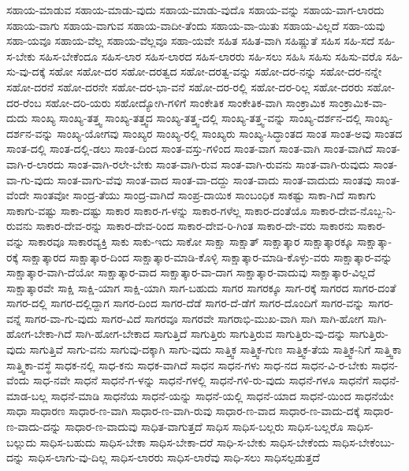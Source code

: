 {ಸಹಾಯ-ಮಾಡುವ
ಸಹಾಯ-ಮಾಡು-ವುದು
ಸಹಾಯ-ಮಾಡು-ವುದೊ
ಸಹಾಯ-ವನ್ನು
ಸಹಾಯ-ವಾಗ-ಲಾರದು
ಸಹಾಯ-ವಾಗು
ಸಹಾಯ-ವಾಗುವ
ಸಹಾಯ-ವಾದೀ-ತೆಂದು
ಸಹಾಯ-ವಾ-ಯಿತು
ಸಹಾಯ-ವಿಲ್ಲದೆ
ಸಹಾ-ಯವು
ಸಹಾ-ಯವೂ
ಸಹಾಯ-ವೆಲ್ಲ
ಸಹಾಯ-ವೆಲ್ಲವೂ
ಸಹಾ-ಯವೇ
ಸಹಿತ
ಸಹಿತ-ವಾಗಿ
ಸಹಿಷ್ಣುತೆ
ಸಹಿಸ
ಸಹಿ-ಸದೆ
ಸಹಿ-ಸ-ಬೇಕು
ಸಹಿಸ-ಬೇಕೆಂದೂ
ಸಹಿಸ-ಲಾರ
ಸಹಿಸ-ಲಾರದ
ಸಹಿಸ-ಲಾರರು
ಸಹಿ-ಸಲು
ಸಹಿಸಿ
ಸಹಿಸು
ಸಹಿಸು-ವರೊ
ಸಹಿ-ಸು-ವು-ದಕ್ಕೆ
ಸಹೋ
ಸಹೋ-ದರ
ಸಹೋ-ದರತ್ವದ
ಸಹೋ-ದರತ್ವ-ವನ್ನು
ಸಹೋ-ದರ-ನನ್ನು
ಸಹೋ-ದರ-ನನ್ನೇ
ಸಹೋ-ದರನೆ
ಸಹೋ-ದರನೇ
ಸಹೋ-ದರ-ಭಾ-ವನೆ
ಸಹೋ-ದರ-ರಲ್ಲಿ
ಸಹೋ-ದರ-ರಿಲ್ಲ
ಸಹೋ-ದರರು
ಸಹೋ-ದರ-ರೆಂಬ
ಸಹೋ-ದರಿ-ಯರು
ಸಹೋದ್ಯೋಗಿ-ಗಳಿಗೆ
ಸಾಂಕೇತಿಕ
ಸಾಂಕೇತಿಕ-ವಾಗಿ
ಸಾಂಕ್ರಾಮಿಕ
ಸಾಂಕ್ರಾಮಿಕ-ವಾ-ದುದು
ಸಾಂಖ್ಯ
ಸಾಂಖ್ಯ-ತತ್ತ್ವ
ಸಾಂಖ್ಯ-ತತ್ತ್ವದ
ಸಾಂಖ್ಯ-ತತ್ತ್ವ-ದಲ್ಲಿ
ಸಾಂಖ್ಯ-ತತ್ತ್ವ-ವನ್ನು
ಸಾಂಖ್ಯ-ದರ್ಶನ-ದಲ್ಲಿ
ಸಾಂಖ್ಯ-ದರ್ಶನ-ವನ್ನು
ಸಾಂಖ್ಯ-ಯೋಗವು
ಸಾಂಖ್ಯರ
ಸಾಂಖ್ಯ-ರಲ್ಲಿ
ಸಾಂಖ್ಯರು
ಸಾಂಖ್ಯ-ಸಿದ್ಧಾಂತದ
ಸಾಂತ
ಸಾಂತ-ಅವು
ಸಾಂತದ
ಸಾಂತ-ದಲ್ಲಿ
ಸಾಂತ-ದಲ್ಲಿ-ಡಲು
ಸಾಂತ-ದಿಂದ
ಸಾಂತ-ವಸ್ತು-ಗಳಿಂದ
ಸಾಂತ-ವಾಗ
ಸಾಂತ-ವಾಗಿ
ಸಾಂತ-ವಾಗಿದೆ
ಸಾಂತ-ವಾಗಿ-ರ-ಲಾರದು
ಸಾಂತ-ವಾಗಿ-ರಲೇ-ಬೇಕು
ಸಾಂತ-ವಾಗಿ-ರುವ
ಸಾಂತ-ವಾಗಿ-ರುವನು
ಸಾಂತ-ವಾಗಿ-ರುವುದು
ಸಾಂತ-ವಾ-ಗು-ವುದು
ಸಾಂತ-ವಾಗು-ವೆವು
ಸಾಂತ-ವಾದ
ಸಾಂತ-ವಾ-ದದ್ದು
ಸಾಂತ-ವಾದು
ಸಾಂತ-ವಾದುದು
ಸಾಂತವು
ಸಾಂತ-ವೆಂದೇ
ಸಾಂತವೋ
ಸಾಂದ್ರ-ತೆಯು
ಸಾಂದ್ರ-ವಾಗಿದೆ
ಸಾಂಪ್ರ-ದಾಯಿಕ
ಸಾಂಬಂಧಿಕ
ಸಾಕಷ್ಟು
ಸಾಕಾ-ಗಿದೆ
ಸಾಕಾಗು
ಸಾಕಾಗು-ವಷ್ಟು
ಸಾಕಾ-ದಷ್ಟು
ಸಾಕಾರ
ಸಾಕಾರ-ಗ-ಳನ್ನು
ಸಾಕಾರ-ಗಳೆಲ್ಲ
ಸಾಕಾರ-ದಂತೆಯೊ
ಸಾಕಾರ-ದೇವ-ನೊಬ್ಬ-ನಿ-ರುವನು
ಸಾಕಾರ-ದೇವ-ರನ್ನು
ಸಾಕಾರ-ದೇವ-ರಿಂದ
ಸಾಕಾರ-ದೇವ-ರಿ-ಗಿಂತ
ಸಾಕಾರ-ದೇ-ವರು
ಸಾಕಾರನು
ಸಾಕಾರ-ವನ್ನು
ಸಾಕಾರವೂ
ಸಾಕಾರವ್ಯಕ್ತಿ
ಸಾಕು
ಸಾಕು-ಇದು
ಸಾಕೋ
ಸಾಕ್ಷಾ
ಸಾಕ್ಷಾತ್
ಸಾಕ್ಷಾತ್ಕಾರ
ಸಾಕ್ಷಾತ್ಕಾರಕ್ಕೂ
ಸಾಕ್ಷಾತ್ಕಾ-ರಕ್ಕೆ
ಸಾಕ್ಷಾತ್ಕಾರದ
ಸಾಕ್ಷಾತ್ಕಾರ-ದಿಂದ
ಸಾಕ್ಷಾತ್ಕಾರ-ಮಾಡಿ-ಕೊಳ್ಳಿ
ಸಾಕ್ಷಾತ್ಕಾರ-ಮಾಡಿ-ಕೊಳ್ಳು-ವರು
ಸಾಕ್ಷಾತ್ಕಾರ-ವನ್ನು
ಸಾಕ್ಷಾತ್ಕಾರ-ವಾಗಿ-ದೆಯೋ
ಸಾಕ್ಷಾತ್ಕಾರ-ವಾದ
ಸಾಕ್ಷಾತ್ಕಾರ-ವಾ-ದಾಗ
ಸಾಕ್ಷಾತ್ಕಾರ-ವಾದುವು
ಸಾಕ್ಷಾತ್ಕಾರ-ವಿಲ್ಲದೆ
ಸಾಕ್ಷಾತ್ಕಾರವೇ
ಸಾಕ್ಷಿ
ಸಾಕ್ಷಿ-ಯಾಗ
ಸಾಕ್ಷಿ-ಯಾಗಿ
ಸಾಗ-ಬಹುದು
ಸಾಗರ
ಸಾಗರಕ್ಕೂ
ಸಾಗ-ರಕ್ಕೆ
ಸಾಗರದ
ಸಾಗರ-ದಂತೆ
ಸಾಗರ-ದಲ್ಲಿ
ಸಾಗರ-ದಲ್ಲಿದ್ದಾಗ
ಸಾಗರ-ದಿಂದ
ಸಾಗರ-ದೆಡೆ
ಸಾಗರ-ದೆ-ಡೆಗೆ
ಸಾಗರ-ದೊಂದಿಗೆ
ಸಾಗರ-ವನ್ನು
ಸಾಗರ-ವನ್ನೆ
ಸಾಗರ-ವಾ-ಗು-ವುದು
ಸಾಗರ-ವಿದೆ
ಸಾಗರವೂ
ಸಾಗರವೇ
ಸಾಗರಾಭಿ-ಮುಖ-ವಾಗಿ
ಸಾಗಿ
ಸಾಗಿ-ಹೋಗ
ಸಾಗಿ-ಹೋಗ-ಬೇಕಾ-ಗಿದೆ
ಸಾಗಿ-ಹೋಗ-ಬೇಕಾದ
ಸಾಗುತ್ತಿದೆ
ಸಾಗುತ್ತಿರು
ಸಾಗುತ್ತಿರುವ
ಸಾಗುತ್ತಿರು-ವು-ದನ್ನು
ಸಾಗುತ್ತಿರು-ವುದು
ಸಾಗುತ್ತಿವೆ
ಸಾಗು-ವನು
ಸಾಗುವು-ದಕ್ಕಾಗಿ
ಸಾಗು-ವುದು
ಸಾತ್ತ್ವಿಕ
ಸಾತ್ತ್ವಿಕ-ಗುಣ
ಸಾತ್ತ್ವಿಕ-ತೆಯ
ಸಾತ್ತ್ವಿಕ-ನಿಗೆ
ಸಾತ್ತ್ವಿಕಾ
ಸಾತ್ತ್ವಿಕಾ-ವಸ್ಥೆ
ಸಾಧಕ-ನಲ್ಲಿ
ಸಾಧ-ಕನು
ಸಾಧಕ-ವಾಗಿದೆ
ಸಾಧನ
ಸಾಧನ-ಗಳು
ಸಾಧ-ನದ
ಸಾಧನ-ವಿ-ರ-ಬೇಕು
ಸಾಧನ-ವೆಂದು
ಸಾಧ-ನವೇ
ಸಾಧನೆ
ಸಾಧನೆ-ಗ-ಳನ್ನು
ಸಾಧನೆ-ಗಳಲ್ಲಿ
ಸಾಧನೆ-ಗಳಿ-ರು-ವುದು
ಸಾಧನೆ-ಗಳೂ
ಸಾಧನೆಗೆ
ಸಾಧನೆ-ಮಾಡ-ಬಲ್ಲ
ಸಾಧನೆ-ಮಾಡಿ
ಸಾಧನೆಯ
ಸಾಧನೆ-ಯನ್ನು
ಸಾಧನೆ-ಯಲ್ಲಿ
ಸಾಧನೆ-ಯಾದ
ಸಾಧನೆ-ಯಿಂದ
ಸಾಧನೆಯೇ
ಸಾಧಾ
ಸಾಧಾರಣ
ಸಾಧಾರ-ಣ-ವಾಗಿ
ಸಾಧಾರ-ಣ-ವಾಗಿ-ರುವು
ಸಾಧಾರ-ಣ-ವಾದ
ಸಾಧಾರ-ಣ-ವಾದು-ದಕ್ಕೆ
ಸಾಧಾರ-ಣ-ವಾದು-ದನ್ನು
ಸಾಧಾರ-ಣ-ವಾದುವು
ಸಾಧಿತ-ವಾಗುತ್ತದೆ
ಸಾಧಿಸ
ಸಾಧಿಸ-ಬಲ್ಲರು
ಸಾಧಿಸ-ಬಲ್ಲರೊ
ಸಾಧಿಸ-ಬಲ್ಲುದು
ಸಾಧಿಸ-ಬಹುದು
ಸಾಧಿಸ-ಬೇಕಾ
ಸಾಧಿಸ-ಬೇಕಾ-ದರೆ
ಸಾಧಿ-ಸ-ಬೇಕು
ಸಾಧಿಸ-ಬೇಕೆಂದು
ಸಾಧಿಸ-ಬೇಕೆಂಬು-ದನ್ನು
ಸಾಧಿಸ-ಲಾಗು-ವು-ದಿಲ್ಲ
ಸಾಧಿಸ-ಲಾರರು
ಸಾಧಿಸ-ಲಾರೆವು
ಸಾಧಿ-ಸಲು
ಸಾಧಿಸಲ್ಪಡುತ್ತದೆ
}
